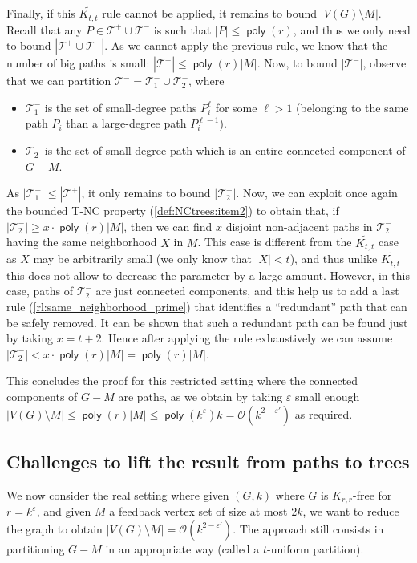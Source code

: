 \documentclass{amsart}
\newcommand{\eps}{\varepsilon}
\newcommand{\mT}{\mathcal{T}}
\newcommand{\KttTilde}{\widetilde{K_{t,t}}}
\DeclareMathOperator\poly{\textsf{poly}}
\newcommand{\ruleref}[1]{\hyperref[#1]{\ref*{#1}}}
\renewcommand{\O}{\mathcal{O}}
\begin{document}
Finally, if this $\KttTilde$ rule cannot be applied, it remains to bound $|V(G) \setminus M|$. 
Recall that any $P \in \mT^+ \cup \mT^-$ is such that $|P| \le \poly(r)$, and thus we only need to bound $|\mT^+ \cup \mT^-|$.
As we cannot apply the previous rule, we know that the number of big paths is small: $|\mT^+| \le \poly(r)|M|$. Now, to bound 
$|\mT^-|$, observe that we can partition $\mT^-=\mT^-_1 \cup \mT^-_2$, where
\begin{itemize}
    \item $\mT^-_1$ is the set of small-degree paths $P_i^\ell$ for some $\ell > 1$ (belonging to the same path $P_i$ than a large-degree path $P_i^{\ell-1}$).
    \item $\mT^-_2$ is the set of small-degree path which is an entire connected component of $G-M$.
\end{itemize}
As $|\mT^-_1| \le |\mT^+|$, it only remains to bound $|\mT^-_2|$.
Now, we can exploit once again the bounded T-NC  property (\autoref{def:NCtrees:item2}) to obtain that, if 
$|\mT^-_2| \ge x\cdot \poly(r)|M|$, then we can find
 $x$ disjoint non-adjacent paths in $\mT^-_2$ having the same neighborhood $X$ in $M$.
 This case is different from the $\KttTilde$ case as $X$ may be arbitrarily small (we only know that $|X|< t$), and thus unlike $\KttTilde$ this does not allow to decrease the parameter by a large amount. However, in this case, paths of $\mT^-_2$
 are just connected components, and this help us to add a last rule (\ruleref{rl:same_neighborhood_prime}) that identifies a ``redundant'' path that can be safely removed. It can be shown that such a redundant path can be found just by taking $x=t+2$. Hence after applying the rule exhaustively we can assume $|\mT^-_2|<x\cdot \poly(r)|M|=\poly(r)|M|$.
 
 This concludes the proof for this restricted setting where the connected components of $G-M$ are paths, as we obtain by taking $\eps$ small enough
 $|V(G)\setminus M| \le \poly(r)|M| \le \poly(k^{\eps})k= \O(k^{2-\eps'})$ as required.
 
 \subsection{Challenges to lift the result from paths to trees}\label{ssec:path2tree}
 We now consider the real setting where given $(G,k)$ where $G$ is $K_{r,r}$-free for $r=k^\eps$, and given $M$ a feedback vertex set of size at most $2k$, we want to reduce the graph to obtain $|V(G)\setminus M|= \O(k^{2-\eps'})$. The approach still consists in partitioning $G-M$ in an appropriate way (called a $t$-uniform partition).
 
\end{document}
